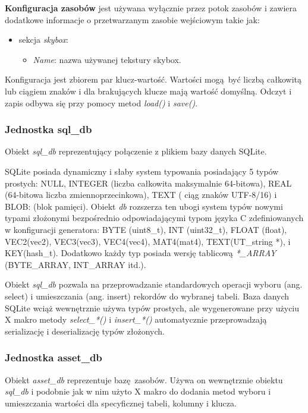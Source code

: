 \textbf{Konfiguracja zasobów} jest używana wyłącznie przez potok zasobów i zawiera dodatkowe informacje o przetwarzanym zasobie wejściowym takie jak:
\begin{itemize}
	\item sekcja \textit{skybox}:
	\begin{itemize}
		\item \textit{Name}: nazwa używanej tekstury skybox.
	\end{itemize}
\end{itemize}

Konfiguracja jest zbiorem par klucz-wartość.
Wartości mogą być liczbą całkowitą lub ciągiem znaków i dla brakujących klucze mają wartość domyślną.
Odczyt i zapis odbywa się przy pomocy metod \textit{load()} i \textit{save()}.


\subsubsection{Jednostka sql\_db}
Obiekt \textit{sql\_db} reprezentujący połączenie z plikiem bazy danych SQLite.

SQLite posiada dynamiczny i słaby system typowania posiadający 5 typów prostych:
NULL, INTEGER (liczba całkowita maksymalnie 64-bitowa), REAL (64-bitowa liczba zmiennoprzecinkowa), TEXT ( ciąg znaków UTF-8/16) i BLOB: (blok pamięci).
Obiekt \textit{db} rozszerza ten ubogi system typów nowymi typami złożonymi bezpośrednio odpowiadającymi typom języka C zdefiniowanych w konfiguracji generatora: BYTE (uint8\_t), INT (uint32\_t), FLOAT (float), VEC2(vec2), VEC3(vec3), VEC4(vec4), MAT4(mat4), TEXT(UT\_string *), i KEY(hash\_t).
Dodatkowo każdy typ posiada wersję tablicową \textit{*\_ARRAY} (BYTE\_ARRAY, INT\_ARRAY itd.).

Obiekt \textit{sql\_db} pozwala na przeprowadzanie standardowych operacji wyboru (ang. select) i umieszczania (ang. insert) rekordów do wybranej tabeli.
Baza danych SQLite wciąż wewnętrznie używa typów prostych, ale wygenerowane przy użyciu X makro metody \textit{select\_*()} i \textit{insert\_*()} automatycznie przeprowadzają serializację i deserializację typów złożonych.


\subsubsection{Jednostka asset\_db}
Obiekt \textit{asset\_db} reprezentuje bazę zasobów.
Używa on wewnętrznie obiektu \textit{sql\_db} i podobnie jak w nim użyto X makro do dodania metod wyboru i umieszczania wartości dla specyficznej tabeli, kolumny i klucza.

